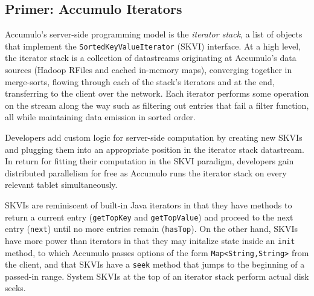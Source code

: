 





\subsection{Primer: Accumulo Iterators}
\label{sAccumuloIterators}
Accumulo's server-side programming model is the %
\emph{iterator stack}, a list of objects that implement the \texttt{SortedKeyValueIterator} (SKVI) interface.
At a high level, the iterator stack is a collection of datastreams originating
at Accumulo's data sources (Hadoop RFiles and cached in-memory maps), converging together in merge-sorts,
flowing through each of the stack's iterators and at the end, transferring to the client over the network.
Each iterator performs some operation on the stream along the way such as filtering out entries that
fail a filter function, all while maintaining data emission in sorted order.

Developers add custom logic for server-side computation
by creating new SKVIs and plugging them into an appropriate position in the iterator stack datastream.
In return for fitting their computation in the SKVI paradigm, developers gain
distributed parallelism for free as Accumulo runs the iterator stack on every relevant tablet simultaneously.


SKVIs are reminiscent of built-in Java iterators %
in that they have methods to return a current entry (\texttt{getTopKey} and \texttt{getTopValue})
and proceed to the next entry (\texttt{next}) until no more entries remain (\texttt{hasTop}).
On the other hand, SKVIs have more power than iterators in that they may initalize state
inside an \texttt{init} method, to which Accumulo passes
options of the form \texttt{Map<String,String>} from the client,
and that SKVIs have a \texttt{seek} method that jumps to the beginning of a passed-in range. 
System SKVIs at the top of an iterator stack perform actual disk seeks.%

